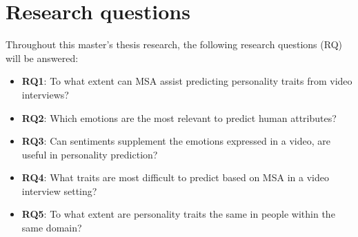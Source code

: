 \section{Research questions}
Throughout this master's thesis research, the following research questions (RQ) will be answered:
%
\begin{itemize}
    \item[] \textbf{RQ1}: To what extent can MSA assist predicting personality traits from video interviews?
    \item[] \textbf{RQ2}: Which emotions are the most relevant to predict human attributes?
    \item[] \textbf{RQ3}: Can sentiments supplement the emotions expressed in a video, are useful in personality prediction?
    \item[] \textbf{RQ4}: What traits are most difficult to predict based on MSA in a video interview setting?  
    \item[] \textbf{RQ5}: To what extent are personality traits the same in people within the same domain?
\end{itemize}
%


